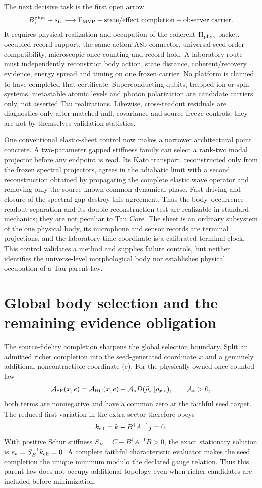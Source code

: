 \documentclass[11pt]{article}
\newcommand{\GMVP}{\Gamma_{\mathrm{MVP}}}
\begin{document}
The next decisive task is the first open arrow
\[
 B_\tau^{\rm phys}+s_U
 \longrightarrow
 \GMVP+\text{state/effect completion}+\text{observer carrier}.
\]
It requires physical realization and occupation of the coherent
\(\Pi_{\rm phys}\) packet,
occupied record support, the same-action A8b connector, universal-seed order
compatibility, microscopic once-counting and record hold.  A laboratory route
must independently reconstruct body action, state distance, coherent/recovery
evidence, energy spread and timing on one frozen carrier.  No platform is
claimed to have completed that certificate.  Superconducting qubits,
trapped-ion or spin systems, metastable atomic levels and photon polarization
are candidate carriers only, not asserted Tau realizations.  Likewise,
cross-readout residuals are diagnostics only after matched null, covariance
and source-freeze controls; they are not by themselves validation statistics.

One conventional elastic-sheet control now makes a narrower architectural
point concrete.  A two-parameter gapped stiffness family can select a
rank-two modal projector before any endpoint is read.  Its Kato transport,
reconstructed only from the frozen spectral projectors, agrees in the
adiabatic limit with a second reconstruction obtained by propagating the
complete elastic wave operator and removing only the source-known common
dynamical phase.  Fast driving and closure of the spectral gap destroy this
agreement.  Thus the body--occurrence--readout separation and its
double-reconstruction test are realizable in standard mechanics; they are not
peculiar to Tau Core.  The sheet is an ordinary subsystem of the one physical
body, its microphone and sensor records are terminal projections, and the
laboratory time coordinate is a calibrated terminal clock.  This control
validates a method and supplies failure controls, but neither identifies the
universe-level morphological body nor establishes physical occupation of a
Tau parent law.


\section{Global body selection and the remaining evidence obligation}

The source-fidelity completion sharpens the global selection boundary.  Split
an admitted richer completion into the seed-generated coordinate \(x\) and a
genuinely additional noncontractible coordinate (e).  For the physically
owned once-counted law
\[
 \mathcal A_{\rm SF}(x,e)
 =\mathcal A_{\rm HC}(x,e)
 +\mathcal A_*D(\widehat\rho_s\|\rho_{x,e}),
 \qquad \mathcal A_*>0,
\]
both terms are nonnegative and have a common zero at the faithful seed
target.  The reduced first variation in the extra sector therefore obeys
\[
 k_{\rm eff}=k-B^\dagger A^{-1}j=0.
\]
With positive Schur stiffness \(S_E=C-B^\dagger A^{-1}B>0\), the exact
stationary solution is \(e_*=S_E^{-1}k_{\rm eff}=0\).  A complete faithful
characteristic evaluator makes the seed completion the unique minimum modulo
the declared gauge relation.  Thus this parent law does not occupy additional
topology even when richer candidates are included before minimization.
\end{document}
